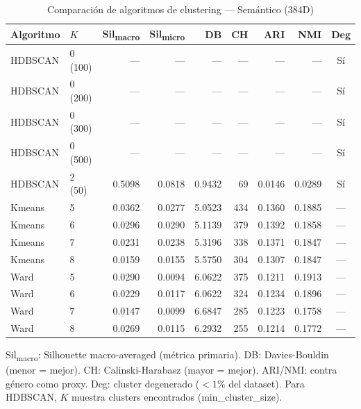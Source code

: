 \begin{table}[htbp]
  \centering
  \small
  \caption{Comparación de algoritmos de clustering --- Semántico (384D)}
  \label{tab:clustering_comparison_semantic_384d}
  \begin{tabular}{llrrrrrrc}
    \toprule
    Algoritmo & $K$ & Sil\textsubscript{macro} & Sil\textsubscript{micro} & DB & CH & ARI & NMI & Deg \\
    \midrule
    HDBSCAN & 0 (100) & --- & --- & --- & --- & --- & --- & Sí \\
    HDBSCAN & 0 (200) & --- & --- & --- & --- & --- & --- & Sí \\
    HDBSCAN & 0 (300) & --- & --- & --- & --- & --- & --- & Sí \\
    HDBSCAN & 0 (500) & --- & --- & --- & --- & --- & --- & Sí \\
    HDBSCAN & 2 (50) & 0.5098 & 0.0818 & 0.9432 & 69 & 0.0146 & 0.0289 & Sí \\
    Kmeans & 5 & 0.0362 & 0.0277 & 5.0523 & 434 & 0.1360 & 0.1885 & --- \\
    Kmeans & 6 & 0.0296 & 0.0290 & 5.1139 & 379 & 0.1392 & 0.1858 & --- \\
    Kmeans & 7 & 0.0231 & 0.0238 & 5.3196 & 338 & 0.1371 & 0.1847 & --- \\
    Kmeans & 8 & 0.0159 & 0.0155 & 5.5750 & 304 & 0.1307 & 0.1847 & --- \\
    Ward & 5 & 0.0290 & 0.0094 & 6.0622 & 375 & 0.1211 & 0.1913 & --- \\
    Ward & 6 & 0.0229 & 0.0117 & 6.0622 & 324 & 0.1234 & 0.1896 & --- \\
    Ward & 7 & 0.0147 & 0.0099 & 6.6847 & 285 & 0.1223 & 0.1758 & --- \\
    Ward & 8 & 0.0269 & 0.0115 & 6.2932 & 255 & 0.1214 & 0.1772 & --- \\
    \bottomrule
  \end{tabular}
  \begin{tablenotes}[flushleft]
    \small
    \item Sil\textsubscript{macro}: Silhouette macro-averaged (métrica primaria). DB: Davies-Bouldin (menor = mejor). CH: Calinski-Harabasz (mayor = mejor). ARI/NMI: contra género como proxy. Deg: cluster degenerado ($<1\%$ del dataset). Para HDBSCAN, $K$ muestra clusters encontrados (min\_cluster\_size).
  \end{tablenotes}
\end{table}